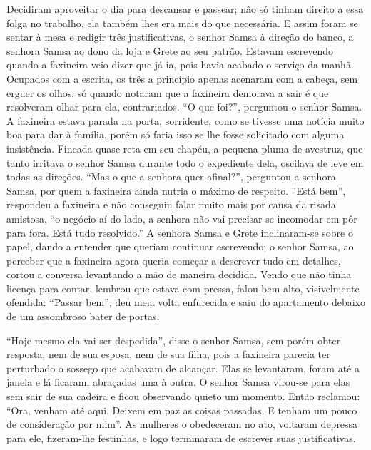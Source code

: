 Decidiram aproveitar o dia para descansar e passear; não só tinham direito
a essa folga no trabalho, ela também lhes era mais do que necessária. E
assim foram se sentar à mesa e redigir três justificativas, o senhor Samsa
à direção do banco, a senhora Samsa ao dono da loja e Grete ao seu patrão.
Estavam escrevendo quando a faxineira veio dizer que já ia, pois havia
acabado o serviço da manhã. Ocupados com a escrita, os três a princípio
apenas acenaram com a cabeça, sem erguer os olhos, só quando notaram que a
faxineira demorava a sair é que resolveram olhar para ela, contrariados.
“O que foi?”, perguntou o senhor Samsa. A faxineira estava parada na
porta, sorridente, como se tivesse uma notícia muito boa para dar à
família, porém só faria isso se lhe fosse solicitado com alguma
insistência. Fincada quase reta em seu chapéu, a pequena pluma de
avestruz, que tanto irritava o senhor Samsa durante todo o expediente
dela, oscilava de leve em todas as direções. “Mas o que a senhora quer
afinal?”, perguntou a senhora Samsa, por quem a faxineira ainda nutria o
máximo de respeito. “Está bem”, respondeu a faxineira e não conseguiu
falar muito mais por causa da risada amistosa, “o negócio aí do lado, a
senhora não vai precisar se incomodar em pôr para fora. Está tudo
resolvido.” A senhora Samsa e Grete inclinaram-se sobre o papel, dando a
entender que queriam continuar escrevendo; o senhor Samsa, ao perceber que
a faxineira agora queria começar a descrever tudo em detalhes, cortou a
conversa levantando a mão de maneira decidida. Vendo que não tinha licença
para contar, lembrou que estava com pressa, falou bem alto, visivelmente
ofendida: “Passar bem”, deu meia volta enfurecida e saiu do apartamento
debaixo de um assombroso bater de portas.

“Hoje mesmo ela vai ser despedida”, disse o senhor Samsa, sem porém obter
resposta, nem de sua esposa, nem de sua filha, pois a faxineira parecia
ter perturbado o sossego que acabavam de alcançar. Elas se levantaram,
foram até a janela e lá ficaram, abraçadas uma à outra. O senhor Samsa
virou-se para elas sem sair de sua cadeira e ficou observando quieto um
momento. Então reclamou: “Ora, venham até aqui. Deixem em paz as coisas
passadas. E tenham um pouco de consideração por mim”. As mulheres o
obedeceram no ato, voltaram depressa para ele, fizeram-lhe festinhas, e
logo terminaram de escrever suas justificativas.

